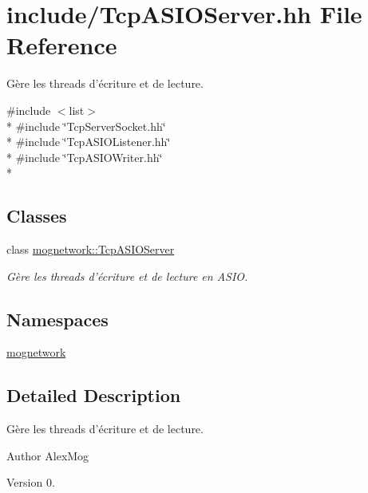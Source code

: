 \hypertarget{_tcp_a_s_i_o_server_8hh}{\section{include/\-Tcp\-A\-S\-I\-O\-Server.hh File Reference}
\label{_tcp_a_s_i_o_server_8hh}
}


Gère les threads d'écriture et de lecture.  


{\ttfamily \#include $<$list$>$}\\*
{\ttfamily \#include \char`\"{}Tcp\-Server\-Socket.\-hh\char`\"{}}\\*
{\ttfamily \#include \char`\"{}Tcp\-A\-S\-I\-O\-Listener.\-hh\char`\"{}}\\*
{\ttfamily \#include \char`\"{}Tcp\-A\-S\-I\-O\-Writer.\-hh\char`\"{}}\\*
\subsection*{Classes}
\begin{DoxyCompactItemize}
\item 
class \hyperlink{classmognetwork_1_1_tcp_a_s_i_o_server}{mognetwork\-::\-Tcp\-A\-S\-I\-O\-Server}
\begin{DoxyCompactList}\small\item\em Gère les threads d'écriture et de lecture en A\-S\-I\-O. \end{DoxyCompactList}\end{DoxyCompactItemize}
\subsection*{Namespaces}
\begin{DoxyCompactItemize}
\item 
\hyperlink{namespacemognetwork}{mognetwork}
\end{DoxyCompactItemize}


\subsection{Detailed Description}
Gère les threads d'écriture et de lecture. \begin{DoxyAuthor}{Author}
Alex\-Mog 
\end{DoxyAuthor}
\begin{DoxyVersion}{Version}
0. 
\end{DoxyVersion}
